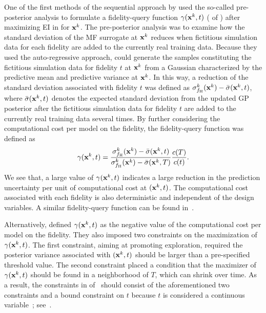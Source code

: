 \documentclass[journal ]{new-aiaa}
\begin{document}
One of the first methods of the sequential approach by \citet{Chen2016} used the so-called pre-posterior analysis to formulate a fidelity-query function $\gamma({\bf x}^k,t)$ ( of ) after maximizing EI in  for ${\bf x}^k$.
The pre-posterior analysis was to examine how the standard deviation of the MF surrogate at ${\bf x}^k$ reduces when fictitious simulation data for each fidelity are added to the currently real training data.
Because they used the auto-regressive approach, \citet{Chen2016} could generate the samples constituting the fictitious simulation data for fidelity $t$ at ${\bf x}^k$ from a Gaussian characterized by the predictive mean and predictive variance at ${\bf x}^k$.
In this way, a reduction of the standard deviation associated with fidelity $t$ was defined as $\sigma_{f_\text{H}}^k({\bf x}^k)-\bar{\sigma}({\bf x}^k,t)$, where $\bar{\sigma}({\bf x}^k,t)$ denotes the expected standard deviation from the updated GP posterior after the fictitious simulation data for fidelity $t$ are added to the currently real training data several times.
By further considering the computational cost per model on the fidelity, the fidelity-query function was defined as
\begin{equation}\label{eqn57}
    \gamma({\bf x}^k,t) = \frac{\sigma_{f_\text{H}}^k({\bf x}^k)-\bar{\sigma}({\bf x}^k,t)}{\sigma_{f_\text{H}}^k({\bf x}^k)-\bar{\sigma}({\bf x}^k,T)} \frac{c(T)}{c(t)}.
\end{equation}
We see that, a large value of $\gamma({\bf x}^k,t)$ indicates a large reduction in the prediction uncertainty per unit of computational cost at $({\bf x}^k,t)$.
The computational cost associated with each fidelity is also deterministic and independent of the design variables. 
A similar fidelity-query function can be found in~\citet{Tran2020jcp,Tran2020cise}.

Alternatively, \citet{Kandasamy2017} defined $\gamma({\bf x}^k,t)$ as the negative value of the computational cost per model on the fidelity.
They also imposed two constraints on the maximization of $\gamma({\bf x}^k,t)$.
The first constraint, aiming at promoting exploration, required the posterior variance associated with $({\bf x}^k,t)$ should be larger than a pre-specified threshold value.
The second constraint placed a condition that the maximizer of $\gamma({\bf x}^k,t)$ should be found in a neighborhood of $T$, which can shrink over time.
As a result, the constraints in  of~ should consist of the aforementioned two constraints and a bound constraint on $t$ because $t$ is considered a continuous variable~\citep{Kandasamy2017}; see~.
\end{document}
